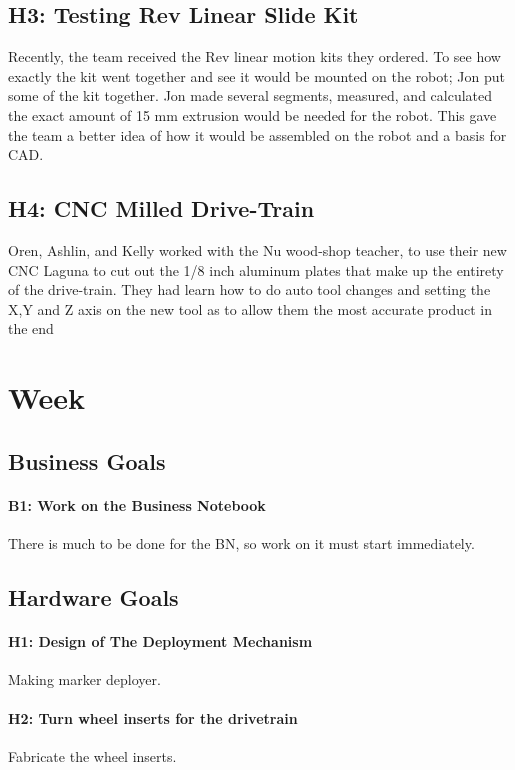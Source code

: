 \documentclass{article}
\begin{document}
\subsection{H3: Testing Rev Linear Slide Kit}

Recently, the team received the Rev linear motion kits they ordered. To see how exactly the kit went together and see it would be mounted on the robot; Jon put some of the kit together. Jon made several segments, measured, and calculated the exact amount of 15 mm extrusion would be needed for the robot. This gave the team a better idea of how it would be assembled on the robot and a basis for CAD.

\subsection{H4: CNC Milled Drive-Train }

Oren, Ashlin, and Kelly worked with the Nu wood-shop teacher, to use their new CNC Laguna to cut out the 1/8 inch aluminum plates that make up the entirety of the drive-train. They had learn how to do auto tool changes and setting the X,Y and Z axis on the new tool as to allow them the most accurate product in the end\clearpage \newpage \section{Week \thesection} 
\subsection{Business Goals}
\paragraph{B1: Work on the Business Notebook}
 There is much to be done for the BN, so work on it must start immediately.
\subsection{Hardware Goals}
\paragraph{H1: Design of The Deployment Mechanism}
 Making marker deployer.
\paragraph{H2: Turn wheel inserts for the drivetrain}
 Fabricate the wheel inserts.
\newpage
\end{document}
